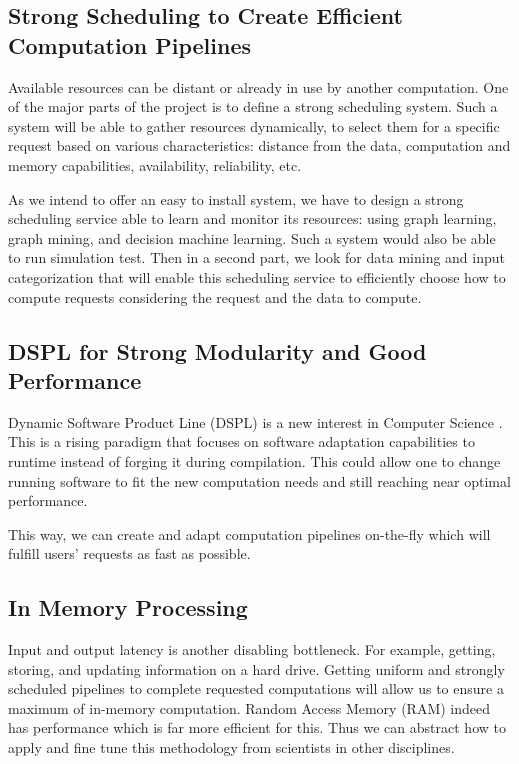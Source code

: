 		\subsection{Strong Scheduling to Create Efficient Computation Pipelines}
			Available resources can be distant or already in use by another computation. One of the major parts of the project is to define a strong scheduling system. Such a system will be able to gather resources dynamically, to select them for a specific request based on various characteristics: distance from the data, computation and memory capabilities, availability, reliability, etc.
			
			As we intend to offer an easy to install system, we have to design a strong scheduling service able to learn and monitor its resources: using graph learning, graph mining, and decision machine learning. Such a system would also be able to run simulation test. Then in a second part, we look for data mining and input categorization that will enable this scheduling service to efficiently choose how to compute requests considering the request and the data to compute.

		\subsection{DSPL for Strong Modularity and Good Performance}
			Dynamic Software Product Line (DSPL) is a new interest in Computer Science \cite{DSPL}. This is a rising paradigm that focuses on software adaptation capabilities to runtime instead of forging it during compilation. This could allow one to change running software to fit the new computation needs and still reaching near optimal performance.
			
			This way, we can create and adapt computation pipelines on-the-fly which will fulfill users' requests as fast as possible.
		
		\subsection{In Memory Processing}
			Input and output latency is another disabling bottleneck. For example, getting, storing, and updating information on a hard drive. Getting uniform and strongly scheduled pipelines to complete requested computations will allow us to ensure a maximum of in-memory computation. Random Access Memory (RAM) indeed has performance which is far more efficient for this. Thus we can abstract how to apply and fine tune this methodology from scientists in other disciplines.
			
